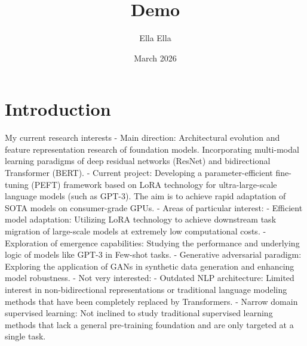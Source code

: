 \documentclass{article}
\title{Demo}
\author{Ella Ella}
\date{March 2026}
\begin{document}
\maketitle

\section{Introduction}
My current research interests 
- Main direction: Architectural evolution and feature representation research of foundation models. Incorporating multi-modal learning paradigms of deep residual networks (ResNet) and bidirectional Transformer (BERT).
- Current project: Developing a parameter-efficient fine-tuning (PEFT) framework based on LoRA technology for ultra-large-scale language models (such as GPT-3). The aim is to achieve rapid adaptation of SOTA models on consumer-grade GPUs.
- Areas of particular interest:
- Efficient model adaptation: Utilizing LoRA technology to achieve downstream task migration of large-scale models at extremely low computational costs.
- Exploration of emergence capabilities: Studying the performance and underlying logic of models like GPT-3 in Few-shot tasks.
- Generative adversarial paradigm: Exploring the application of GANs in synthetic data generation and enhancing model robustness. 
- Not very interested:
- Outdated NLP architecture: Limited interest in non-bidirectional representations or traditional language modeling methods that have been completely replaced by Transformers.
- Narrow domain supervised learning: Not inclined to study traditional supervised learning methods that lack a general pre-training foundation and are only targeted at a single task.
\end{document}
